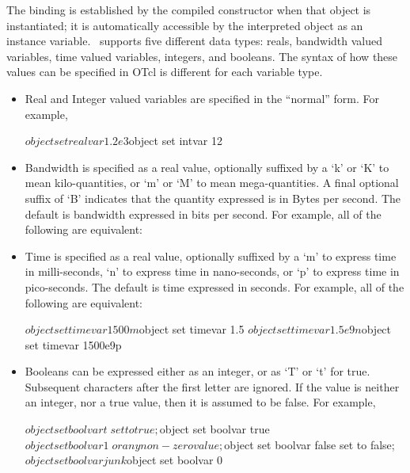 The binding is established by the compiled constructor
when that object is instantiated;
it is automatically accessible by the interpreted object as 
an instance variable.
\ns\ supports five different data types: reals, bandwidth valued variables, 
time valued variables, integers, and booleans.
The syntax of how these values can be specified in OTcl is different
for each variable type.
\begin{itemize}\itemsep0pt
\item Real and Integer valued variables are specified in the ``normal'' form.
        For example,
        \begin{program}
        $object set realvar 1.2e3
        $object set intvar  12
        \end{program}
\item Bandwidth is specified as a real value, optionally
  suffixed by a `k' or `K' to mean kilo-quantities, or `m' or `M' to
  mean mega-quantities.
  A final optional suffix of `B' indicates that the quantity expressed
  is in Bytes per second.
  The default is bandwidth expressed in bits per second.
        For example, all of the following are equivalent:

\item Time is specified as a real value, optionally suffixed by a
  `m' to express time in milli-seconds, `n' to express time in
  nano-seconds, or `p' to express time in pico-seconds.
  The default is time expressed in seconds.
        For example, all of the following are equivalent:
        \begin{program}
        $object set timevar 1500m
        $object set timevar 1.5
        $object set timevar 1.5e9n
        $object set timevar 1500e9p
        \end{program}

\item Booleans can be expressed either as an integer, or as `T' or `t'
  for true.  Subsequent characters after the first letter are ignored.
  If the value is neither an integer, nor a true value,
  then it is assumed to be false.
        For example,
        \begin{program}
        $object set boolvar t           \; set to true;
        $object set boolvar true
        $object set boolvar 1   \; or any non-zero value;

        $object set boolvar false       \; set to false;
        $object set boolvar junk        
        $object set boolvar 0
        \end{program}

\end{itemize}

